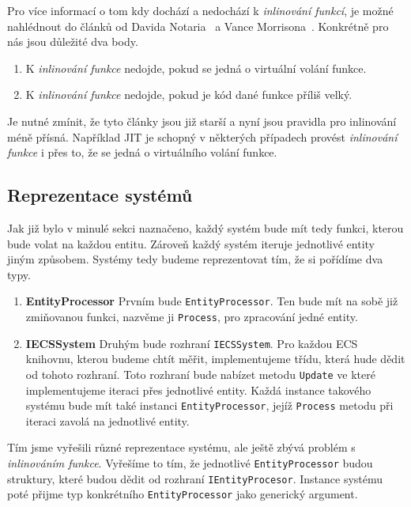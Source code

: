 Pro více informací o tom kdy dochází a nedochází k \textit{inlinování funkcí}, je možné nahlédnout do článků od Davida Notaria~\cite{Notario_2004} a Vance Morrisona~\cite{Morrison_2008}. Konkrétně pro nás jsou důležité dva body.

\begin{enumerate}
    \item K \textit{inlinování funkce} nedojde, pokud se jedná o virtuální volání funkce.
    \item K \textit{inlinování funkce} nedojde, pokud je kód dané funkce příliš velký.
\end{enumerate}

Je nutné zmínit, že tyto články jsou již starší a nyní jsou pravidla pro inlinování méně přísná. Například JIT je schopný v některých případech provést \textit{inlinování funkce} i přes to, že se jedná o virtuálního volání funkce.

\subsection{Reprezentace systémů}
Jak již bylo v minulé sekci naznačeno, každý systém bude mít tedy funkci, kterou bude volat na každou entitu. Zároveň každý systém iteruje jednotlivé entity jiným způsobem. Systémy tedy budeme reprezentovat tím, že si pořídíme dva typy.

\begin{enumerate}
    \item \textbf{EntityProcessor} Prvním bude \verb|EntityProcessor|. Ten bude mít na sobě již zmiňovanou funkci, nazvěme ji \verb|Process|, pro zpracování jedné entity.
    \item \textbf{IECSSystem} Druhým bude rozhraní \verb|IECSSystem|. Pro každou ECS knihovnu, kterou budeme chtít měřit, implementujeme třídu, která hude dědit od tohoto rozhraní. Toto rozhraní bude nabízet metodu \verb|Update| ve které implementujeme iteraci přes jednotlivé entity. Každá instance takového systému bude mít také instanci \verb|EntityProcessor|, jejíž \verb|Process| metodu při iteraci zavolá na jednotlivé entity.
\end{enumerate}

Tím jsme vyřešili různé reprezentace systému, ale ještě zbývá problém s \textit{inlinováním funkce}. Vyřešíme to tím, že jednotlivé \verb|EntityProcessor| budou struktury, které budou dědit od rozhraní \verb|IEntityProcesor|. Instance systému poté přijme typ konkrétního \verb|EntityProcessor| jako generický argument.

